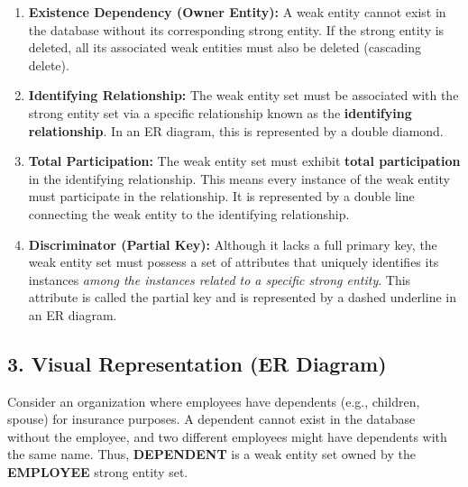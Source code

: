 \documentclass[12pt,a3paper]{article}
\begin{document}
\begin{enumerate}
\begin{tcolorbox}[enhanced,breakable,ansbox,colback=cA!4,colframe=cA,boxrule=0.8pt,arc=5pt,title={\textbf{Answer}},fonttitle=\bfseries\color{white},colbacktitle=cA]
\begin{enumerate}
    \item \textbf{Existence Dependency (Owner Entity):} A weak entity cannot exist in the database without its corresponding strong entity. If the strong entity is deleted, all its associated weak entities must also be deleted (cascading delete).
    \item \textbf{Identifying Relationship:} The weak entity set must be associated with the strong entity set via a specific relationship known as the \textbf{identifying relationship}. In an ER diagram, this is represented by a double diamond.
    \item \textbf{Total Participation:} The weak entity set must exhibit \textbf{total participation} in the identifying relationship. This means every instance of the weak entity must participate in the relationship. It is represented by a double line connecting the weak entity to the identifying relationship.
    \item \textbf{Discriminator (Partial Key):} Although it lacks a full primary key, the weak entity set must possess a set of attributes that uniquely identifies its instances \textit{among the instances related to a specific strong entity}. This attribute is called the partial key and is represented by a dashed underline in an ER diagram.
\end{enumerate}

\subsection*{3. Visual Representation (ER Diagram)}

Consider an organization where employees have dependents (e.g., children, spouse) for insurance purposes. A dependent cannot exist in the database without the employee, and two different employees might have dependents with the same name. Thus, \textbf{DEPENDENT} is a weak entity set owned by the \textbf{EMPLOYEE} strong entity set.

\vspace{1.5em}
\begin{center}
\begin{tikzpicture}[
    thick,
    entity/.style={draw, rectangle, rounded corners, minimum width=3cm, minimum height=1.2cm, align=center, fill=white, font=\bfseries},
    weakentity/.style={draw, double, double distance=1.5pt, rectangle, rounded corners, minimum width=3cm, minimum height=1.2cm, align=center, fill=white, font=\bfseries},
    identrel/.style={draw, double, double distance=1.5pt, diamond, aspect=1.5, minimum width=2.5cm, minimum height=1.2cm, align=center, fill=white, font=\bfseries},
    attribute/.style={draw, ellipse, minimum width=2.2cm, minimum height=0.8cm, align=center, fill=white, font=\small}
]


\end{tikzpicture}
\end{center}
\end{tcolorbox}
\end{enumerate}
\end{document}
